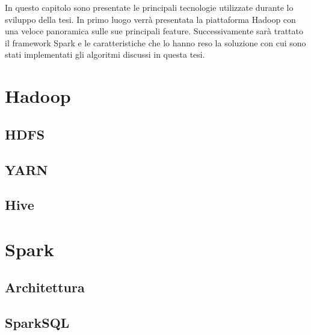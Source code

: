 In questo capitolo sono presentate le principali tecnologie utilizzate durante lo sviluppo della tesi.
In primo luogo verrà presentata la piattaforma Hadoop con una veloce panoramica sulle sue principali feature.
Successivamente sarà trattato il framework Spark e le caratteristiche che lo hanno reso la 
soluzione con cui sono stati implementati gli algoritmi discussi in questa tesi.

\section{Hadoop}\label{sec:bd:hadoop}


\subsection{HDFS}\label{subsec:db:hdfs}


\subsection{YARN}\label{subsec:db:yarn}


\subsection{Hive}\label{subsec:db:hive}


\section{Spark}\label{sec:bd:spark}


\subsection{Architettura}\label{subsec:db:architecture}


\subsection{SparkSQL}\label{subsec:db:sparksql}
